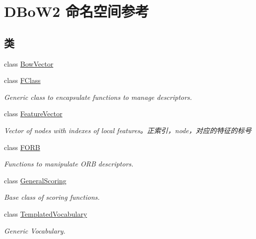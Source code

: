 \hypertarget{namespaceDBoW2}{\section{D\-Bo\-W2 命名空间参考}
\label{namespaceDBoW2}
}
\subsection*{类}
\begin{DoxyCompactItemize}
\item 
class \hyperlink{classDBoW2_1_1BowVector}{Bow\-Vector}
\item 
class \hyperlink{classDBoW2_1_1FClass}{F\-Class}
\begin{DoxyCompactList}\small\item\em Generic class to encapsulate functions to manage descriptors. \end{DoxyCompactList}\item 
class \hyperlink{classDBoW2_1_1FeatureVector}{Feature\-Vector}
\begin{DoxyCompactList}\small\item\em Vector of nodes with indexes of local features。正索引，node，对应的特征的标号 \end{DoxyCompactList}\item 
class \hyperlink{classDBoW2_1_1FORB}{F\-O\-R\-B}
\begin{DoxyCompactList}\small\item\em Functions to manipulate O\-R\-B descriptors. \end{DoxyCompactList}\item 
class \hyperlink{classDBoW2_1_1GeneralScoring}{General\-Scoring}
\begin{DoxyCompactList}\small\item\em Base class of scoring functions. \end{DoxyCompactList}\item 
class \hyperlink{classDBoW2_1_1TemplatedVocabulary}{Templated\-Vocabulary}
\begin{DoxyCompactList}\small\item\em Generic Vocabulary. \end{DoxyCompactList}\end{DoxyCompactItemize}
